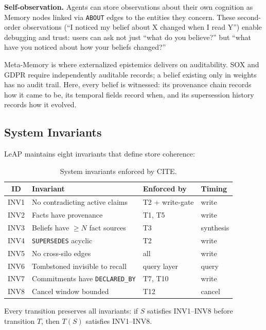 \documentclass[11pt,letterpaper]{article}
\begin{document}
\textbf{Self-observation.} Agents can store observations about their own cognition as Memory nodes linked via \texttt{ABOUT} edges to the entities they concern. These second-order observations (``I noticed my belief about X changed when I read Y'') enable debugging and trust: users can ask not just ``what do you believe?'' but ``what have you noticed about how your beliefs changed?''

Meta-Memory is where externalized epistemics delivers on auditability. SOX and GDPR require independently auditable records; a belief existing only in weights has no audit trail. Here, every belief is witnessed: its provenance chain records how it came to be, its temporal fields record when, and its supersession history records how it evolved.

\subsection{System Invariants}

LeAP maintains eight invariants that define store coherence:

\begin{table}[H]
\centering
\caption{System invariants enforced by CITE.}
\label{tab:invariants}
\begin{tabular}{@{}clll@{}}
\toprule
\textbf{ID} & \textbf{Invariant} & \textbf{Enforced by} & \textbf{Timing} \\
\midrule
INV1 & No contradicting active claims & T2 + write-gate & write \\
INV2 & Facts have provenance & T1, T5 & write \\
INV3 & Beliefs have $\geq N$ fact sources & T3 & synthesis \\
INV4 & \texttt{SUPERSEDES} acyclic & T2 & write \\
INV5 & No cross-silo edges & all & write \\
INV6 & Tombstoned invisible to recall & query layer & query \\
INV7 & Commitments have \texttt{DECLARED\_BY} & T7, T10 & write \\
INV8 & Cancel window bounded & T12 & cancel \\
\bottomrule
\end{tabular}
\end{table}

Every transition preserves all invariants: if $S$ satisfies INV1--INV8 before transition $T$, then $T(S)$ satisfies INV1--INV8.

\end{document}
